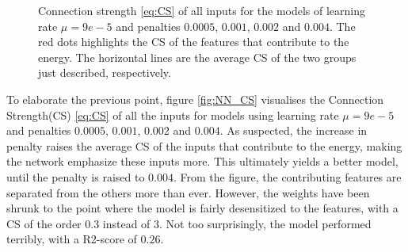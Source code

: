 \begin{figure}[H]
\qquad
{}
\caption{Connection strength \autoref{eq:CS} of all inputs for the models of learning rate $\mu = 9e-5$ and penalties $0.0005$, $0.001$, $0.002$ and $0.004$. The red dots highlights the CS of the features that contribute to the energy. The horizontal lines are the average CS of the two groups just described, respectively.}
\label{fig:NN_CS}
\end{figure}

To elaborate the previous point, figure \autoref{fig:NN_CS} visualises the Connection Strength(CS) \autoref{eq:CS} of all the inputs for models using learning rate  $\mu = 9e-5$ and penalties $0.0005$, $0.001$, $0.002$ and $0.004$. As suspected, the increase in penalty raises the average CS of the inputs that 
contribute to the energy, making the network emphasize these inputs more. This ultimately yields a better model, until the penalty is raised to $0.004$. From the figure, the contributing features are separated from the others more than ever. However, the weights have been shrunk to the point where the model is fairly desensitized to the features, with a CS of the order 0.3 instead of 3. Not too surprisingly, the model performed terribly, with a R2-score of $0.26$.

